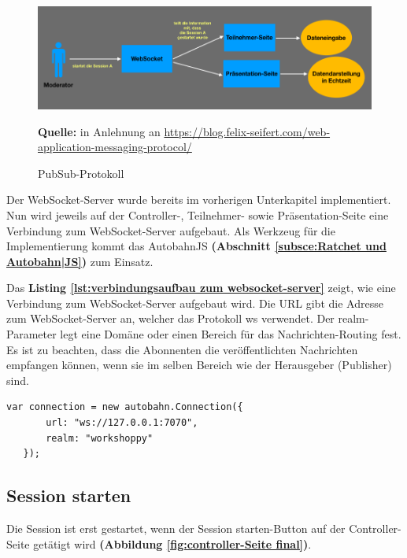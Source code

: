 \begin{figure}[H]
  \begin{center}
    \includegraphics[scale=0.4]{img/workflow_mit_websocket_controller_seite}
	\caption{PubSub-Protokoll} 
	\footnotesize\sffamily\textbf{Quelle:} in Anlehnung an \url{https://blog.felix-seifert.com/web-application-messaging-protocol/}
	\label{fig:workflow_mit_websocket_controller_seite}
  \end{center}   
\end{figure}

Der WebSocket-Server wurde bereits im vorherigen Unterkapitel implementiert. Nun wird jeweils auf der Controller-, Teilnehmer- sowie Präsentation-Seite eine Verbindung zum WebSocket-Server aufgebaut. Als Werkzeug für die Implementierung kommt das AutobahnJS \textbf{(Abschnitt \ref{subsce:Ratchet und Autobahn|JS})} zum Einsatz.\bigskip

Das \textbf{Listing \ref{lst:verbindungsaufbau zum websocket-server}} zeigt, wie eine Verbindung zum WebSocket-Server aufgebaut wird. Die URL gibt die Adresse zum WebSocket-Server an, welcher das Protokoll \glqq ws\grqq{} verwendet. Der \glqq realm\grqq{}-Parameter legt eine Domäne oder einen Bereich für das Nachrichten-Routing fest. Es ist zu beachten, dass die Abonnenten die veröffentlichten Nachrichten empfangen können, wenn sie im selben Bereich wie der Herausgeber (Publisher) sind.\bigskip 

\begin{lstlisting}[caption={Verbindungsaufbau zum WebSocket-Server - php}, label=lst:verbindungsaufbau zum websocket-server, captionpos=b]
var connection = new autobahn.Connection({
       url: "ws://127.0.0.1:7070",
       realm: "workshoppy"
   });
\end{lstlisting}

\newpage
\subsection{Session starten}
\label{Session starten}
Die Session ist erst gestartet, wenn der \glqq Session starten\grqq{}-Button auf der Controller-Seite getätigt wird \textbf{(Abbildung \ref{fig:controller-Seite final})}.\bigskip


